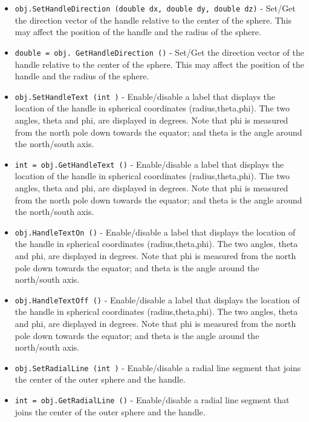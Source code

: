 \begin{itemize}
\item  \verb|obj.SetHandleDirection (double dx, double dy, double dz)| -  Set/Get the direction vector of the handle relative to the center of
 the sphere. This may affect the position of the handle and the radius
 of the sphere.

\item  \verb|double = obj. GetHandleDirection ()| -  Set/Get the direction vector of the handle relative to the center of
 the sphere. This may affect the position of the handle and the radius
 of the sphere.

\item  \verb|obj.SetHandleText (int )| -  Enable/disable a label that displays the location of the handle in
 spherical coordinates (radius,theta,phi). The two angles, theta and
 phi, are displayed in degrees. Note that phi is measured from the
 north pole down towards the equator; and theta is the angle around 
 the north/south axis.

\item  \verb|int = obj.GetHandleText ()| -  Enable/disable a label that displays the location of the handle in
 spherical coordinates (radius,theta,phi). The two angles, theta and
 phi, are displayed in degrees. Note that phi is measured from the
 north pole down towards the equator; and theta is the angle around 
 the north/south axis.

\item  \verb|obj.HandleTextOn ()| -  Enable/disable a label that displays the location of the handle in
 spherical coordinates (radius,theta,phi). The two angles, theta and
 phi, are displayed in degrees. Note that phi is measured from the
 north pole down towards the equator; and theta is the angle around 
 the north/south axis.

\item  \verb|obj.HandleTextOff ()| -  Enable/disable a label that displays the location of the handle in
 spherical coordinates (radius,theta,phi). The two angles, theta and
 phi, are displayed in degrees. Note that phi is measured from the
 north pole down towards the equator; and theta is the angle around 
 the north/south axis.

\item  \verb|obj.SetRadialLine (int )| -  Enable/disable a radial line segment that joins the center of the
 outer sphere and the handle.

\item  \verb|int = obj.GetRadialLine ()| -  Enable/disable a radial line segment that joins the center of the
 outer sphere and the handle.


\end{itemize}
